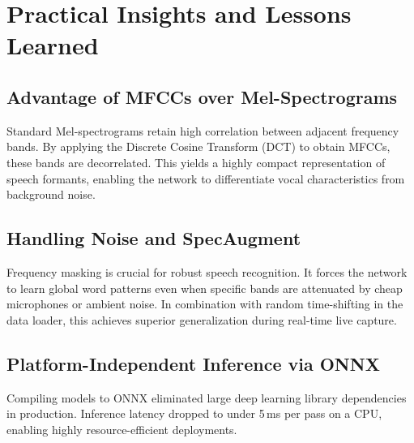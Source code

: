 \documentclass[11pt,a4paper]{article}
\begin{document}
\newpage
\section{Practical Insights and Lessons Learned}

\subsection{Advantage of MFCCs over Mel-Spectrograms}
Standard Mel-spectrograms retain high correlation between adjacent frequency bands. By applying the Discrete Cosine Transform (DCT) to obtain MFCCs, these bands are decorrelated. This yields a highly compact representation of speech formants, enabling the network to differentiate vocal characteristics from background noise.

\subsection{Handling Noise and SpecAugment}
Frequency masking is crucial for robust speech recognition. It forces the network to learn global word patterns even when specific bands are attenuated by cheap microphones or ambient noise. In combination with random time-shifting in the data loader, this achieves superior generalization during real-time live capture.

\subsection{Platform-Independent Inference via ONNX}
Compiling models to ONNX eliminated large deep learning library dependencies in production. Inference latency dropped to under 5\,ms per pass on a CPU, enabling highly resource-efficient deployments.
\end{document}
